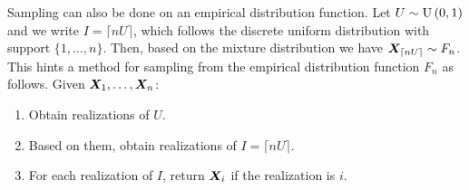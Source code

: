 \begin{enumerate}
Sampling can also be done on an empirical distribution function.
Let \(U\sim\operatorname{U}\left(0,1\right)\) and we write \(I=\lceil nU\rceil\), which follows the
discrete uniform distribution with support \(\{1,\dotsc,n\}\). Then, based on
the mixture distribution we have \(\bm{X}_{\lceil nU\rceil}\sim
F_n\). This hints a method for sampling from the empirical
distribution function \(F_n\) as follows. Given
\(\bm{X}_1,\dotsc,\bm{X}_n\):
\begin{enumerate}[label={(\arabic*)}]
\item Obtain realizations of \(U\).
\item Based on them, obtain realizations of \(I=\lceil nU\rceil\).
\item For each realization of \(I\), return \(\bm{X}_i\) if the realization
is \(i\).
\end{enumerate}
\end{enumerate}
